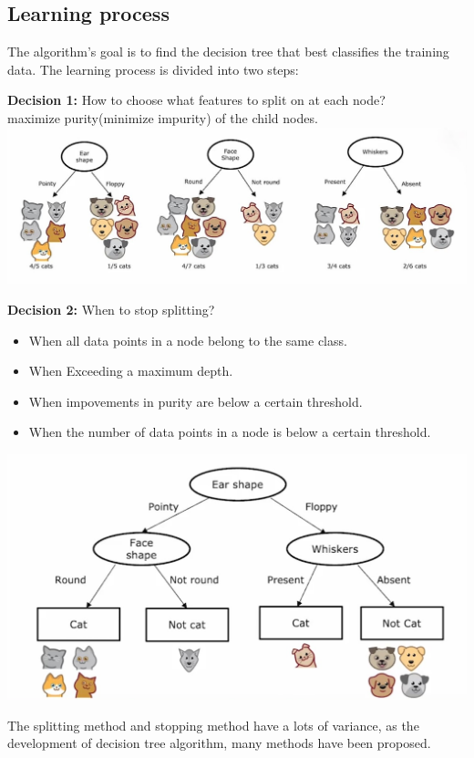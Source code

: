 \subsection*{Learning process}
The algorithm's goal is to find the decision tree that best classifies the training data.
The learning process is divided into two steps:\par
\textbf{Decision 1:} How to choose what features to split on at each node?\\
maximize purity(minimize impurity) of the child nodes.\\
\includegraphics[width=\textwidth]{images/11.3}
\par
\textbf{Decision 2:} When to stop splitting?\\
\begin{itemize}
    \item When all data points in a node belong to the same class.
    \item When Exceeding a maximum depth.
    \item When impovements in purity are below a certain threshold.
    \item When the number of data points in a node is below a certain threshold.
\end{itemize}
\par
\includegraphics*[width=\textwidth]{images/11.4}
\par
The splitting method and stopping method have a lots of variance,
as the development of decision tree algorithm, many methods have been proposed.
